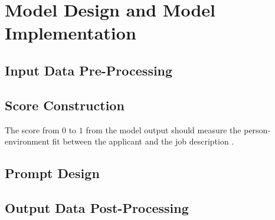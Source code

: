 \documentclass[draft,final]{thesisclass} %
\begin{document}
\section{Model Design and Model Implementation} \label{implementation}

\subsection{Input Data Pre-Processing}
\lipsum[1]

\subsection{Score Construction}
The score from $0$ to $1$ from the model output should measure the person-environment fit between the applicant and the job description \cite[1]{po_and_pj_fit_literature_review}.

\subsection{Prompt Design}
\lipsum[1]

\subsection{Output Data Post-Processing}
\lipsum[1]
\end{document}
